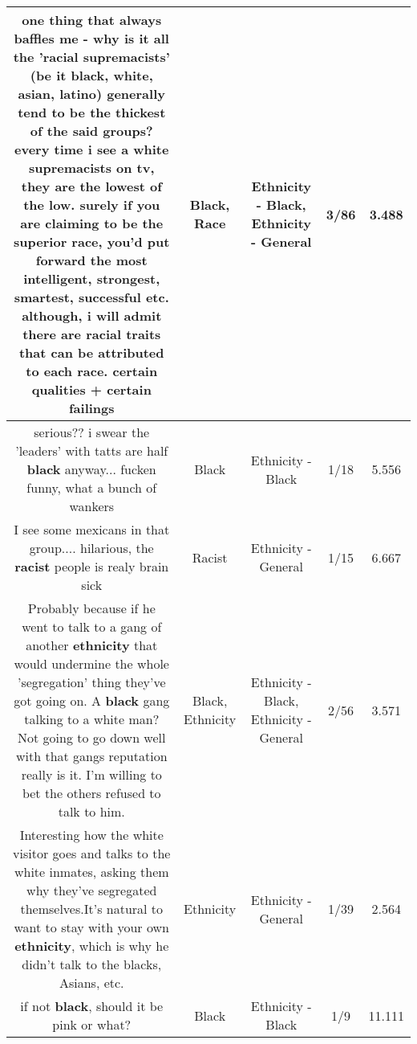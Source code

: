 \documentclass[11pt]{article}
\newlength\mylength
\begin{document}
\begin{center}
\begin{longtable}{|C{.65\mylength}|C{.30\mylength}|C{.12\mylength}|C{.12\mylength}|C{.12\mylength}|}
  \small one thing that always baffles me - why is it all the 'racial supremacists' (be it \textbf{black}, white, asian, latino) generally tend to be the thickest of the said groups?  every time i see a white supremacists on tv, they are the lowest of the low.  surely if you are claiming to be the superior \textbf{race}, you'd put forward the most intelligent, strongest, smartest, successful etc.  although, i will admit there are racial traits that can be attributed to each \textbf{race}.  certain qualities + certain failings\normalsize   & Black, Race & Ethnicity - Black, Ethnicity - General & 3/86 & 3.488 \\  \hline
  \small serious?? i swear the 'leaders' with tatts are half \textbf{black} anyway... fucken funny, what a bunch of wankers\normalsize   & Black & Ethnicity - Black & 1/18 & 5.556 \\  \hline
  \small I see some mexicans in that group.... hilarious, the \textbf{racist} people is realy brain sick\normalsize   & Racist & Ethnicity - General & 1/15 & 6.667 \\  \hline
  \small Probably because if he went to talk to a gang of another \textbf{ethnicity} that would undermine the whole 'segregation' thing they've got going on. A \textbf{black} gang talking to a white man? Not going to go down well with that gangs reputation really is it. I'm willing to bet the others refused to talk to him.\normalsize   & Black, Ethnicity & Ethnicity - Black, Ethnicity - General & 2/56 & 3.571 \\  \hline
  \small Interesting how the white visitor goes and talks to the white inmates, asking them why they've segregated themselves.It's natural to want to stay with your own \textbf{ethnicity}, which is why he didn't talk to the blacks, Asians, etc.\normalsize   & Ethnicity & Ethnicity - General & 1/39 & 2.564 \\  \hline
  \small if not \textbf{black}, should it be pink or what?\normalsize   & Black & Ethnicity - Black & 1/9 & 11.111 \\  \hline

\end{longtable}
\end{center}
\end{document}

